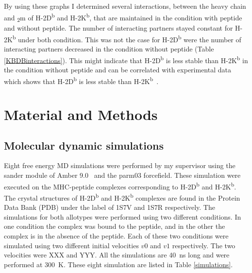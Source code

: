 \documentclass[11pt,twocolumn]{article}
\newcommand{\db}{H-2D\textsuperscript{b}\xspace}
\newcommand{\kb}{H-2K\textsuperscript{b}\xspace}
\newcommand{\btm}{\textbeta\textsubscript{2}m\xspace}
\begin{document}
By using these graphs I determined several interactions, between the heavy
chain and \btm of \db and \kb, that are maintained in the condition with
peptide and  without peptide. The number of interacting partners stayed
constant for \kb under both condition. This was not the case for \db were the
number of interacting partners decreased in the condition without peptide
(Table \ref{KBDBinteractions}). This might indicate that \db is less stable
than \kb in the condition without peptide and can be correlated with
experimental data which shows that \db is less stable than
\kb~\cite{Shields1999561}.

\section*{Material and Methods}

\subsection*{Molecular dynamic simulations}

Eight free energy MD simulations were  performed by my supervisor using the
sander module of Amber 9.0~\cite{case2005amber} and the parm03 forcefield.
These simulation were executed on the  MHC-peptide complexes corresponding to
\db and  \kb.  The crystal structures of \db and  \kb complexes are found in
the Protein Data Bank (PDB) under the label of 1S7V and  1S7R respectively.
The simulations for both allotypes were performed using two different
conditions.  In one condition the complex was bound to the peptide, and in the
other  the complex is in the absence of the peptide.  Each of these two
conditions were simulated using two different initial velocities $v0$ and $v1$
respectively. The two velocities were XXX and YYY.  All the simulations are
\SI{40}{\nano\second} long and were performed  at \SI{300}{\kelvin}. These
eight simulation are listed in Table \ref{simulations}.
\end{document}
